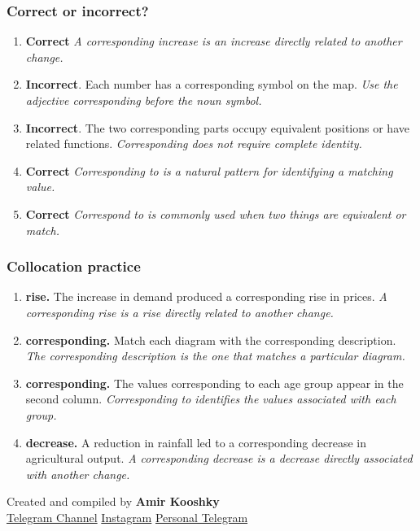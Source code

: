 \documentclass[11pt]{article}
\begin{document}
\subsubsection{Correct or incorrect?}
\begin{enumerate}
  \item \textbf{Correct} \emph{A corresponding increase is an increase directly related to another change.}
  \item \textbf{Incorrect}. Each number has a corresponding symbol on the map. \emph{Use the adjective corresponding before the noun symbol.}
  \item \textbf{Incorrect}. The two corresponding parts occupy equivalent positions or have related functions. \emph{Corresponding does not require complete identity.}
  \item \textbf{Correct} \emph{Corresponding to is a natural pattern for identifying a matching value.}
  \item \textbf{Correct} \emph{Correspond to is commonly used when two things are equivalent or match.}
\end{enumerate}

\subsubsection{Collocation practice}
\begin{enumerate}
  \item \textbf{rise.} The increase in demand produced a corresponding rise in prices. \emph{A corresponding rise is a rise directly related to another change.}
  \item \textbf{corresponding.} Match each diagram with the corresponding description. \emph{The corresponding description is the one that matches a particular diagram.}
  \item \textbf{corresponding.} The values corresponding to each age group appear in the second column. \emph{Corresponding to identifies the values associated with each group.}
  \item \textbf{decrease.} A reduction in rainfall led to a corresponding decrease in agricultural output. \emph{A corresponding decrease is a decrease directly associated with another change.}
\end{enumerate}

\vfill
\begin{center}
\small\color{Muted} Created and compiled by \textbf{Amir Kooshky}\\
\href{https://t.me/KooshkyTOEFL}{Telegram Channel}\quad\textbullet\quad
\href{https://www.instagram.com/kooshkytoefl}{Instagram}\quad\textbullet\quad
\href{https://t.me/KooshkyTOEFL\_pv}{Personal Telegram}
\end{center}
\end{document}
